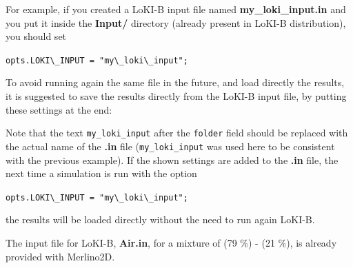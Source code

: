 \documentclass[12pt,a4paper]{article}
\newcommand{\matlabs}[1]{{\lstinline[style=MatlabStyle]!#1!}}
\begin{document}
	For example, if you created a LoKI-B input file named \textbf{my\_loki\_input.in} and you put it inside the \textbf{Input/} directory (already present in LoKI-B distribution), you should set 
	
	\matlabs{opts.LOKI\_INPUT = "my\_loki\_input";}
	
	\vspace{10pt}
	
	\noindent To avoid running again the same file in the future, and load directly the results, it is suggested to save the results directly from the LoKI-B input file, by putting these settings at the end:
	
	
	
	\noindent Note that the text \matlabs{my_loki_input} after the \matlabs{folder} field should be replaced with the actual name of the \textbf{.in} file (\matlabs{my_loki_input} was used here to be consistent with the previous example).  
	If the shown settings are added to the \textbf{.in} file, the next time a simulation is run with the option
	
	\matlabs{opts.LOKI\_INPUT = "my\_loki\_input";}
	
	\noindent the results will be loaded directly without the need to run again LoKI-B.
	
	The input file for LoKI-B, \textbf{Air.in}, for a mixture of (79 \%) - (21 \%), is already provided with Merlino2D.
	
\end{document}
